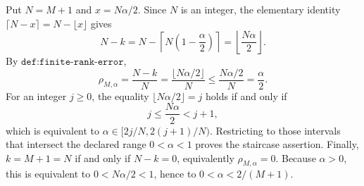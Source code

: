 Put \(N=M+1\) and \(x=N\alpha/2\). Since \(N\) is an integer, the elementary identity \(\lceil N-x\rceil=N-\lfloor x\rfloor\) gives
\[
N-k=N-\left\lceil N\left(1-\frac{\alpha}{2}\right)\right\rceil=\left\lfloor\frac{N\alpha}{2}\right\rfloor.
\]
By \(\texttt{def:finite-rank-error}\),
\[
\rho_{M,\alpha}=\frac{N-k}{N}=\frac{\lfloor N\alpha/2\rfloor}{N}\le \frac{N\alpha/2}{N}=\frac{\alpha}{2}.
\]
For an integer \(j\ge0\), the equality \(\lfloor N\alpha/2\rfloor=j\) holds if and only if
\[
j\le\frac{N\alpha}{2}<j+1,
\]
which is equivalent to \(\alpha\in[2j/N,2(j+1)/N)\). Restricting to those intervals that intersect the declared range \(0<\alpha<1\) proves the staircase assertion. Finally, \(k=M+1=N\) if and only if \(N-k=0\), equivalently \(\rho_{M,\alpha}=0\). Because \(\alpha>0\), this is equivalent to \(0<N\alpha/2<1\), hence to \(0<\alpha<2/(M+1)\).